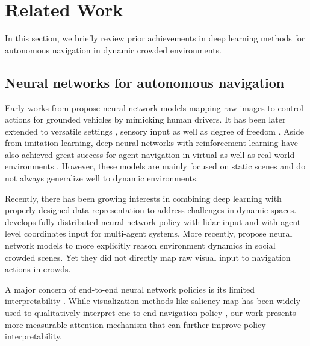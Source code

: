 \documentclass[10pt,twocolumn,letterpaper]{article}
\begin{document}

\section{Related Work}

In this section, we briefly review prior achievements in deep learning methods for autonomous navigation in dynamic crowded environments. 

\subsection{Neural networks for autonomous navigation}

Early works from \cite{dean_pomerleau_alvinn:_1989, muller_off-road_2006} propose neural network models mapping raw images to control actions for grounded vehicles by mimicking human drivers. It has been later extended to versatile settings \cite{chen_deepdriving:_2015, bojarski_end_2016, pan_agile_2017}, sensory input \cite{pfeiffer_perception_2017} as well as degree of freedom \cite{loquercio_dronet:_2018, levine_end--end_2015}. Aside from imitation learning, deep neural networks with reinforcement learning have also achieved great success for agent navigation in virtual \cite{mirowski_learning_2016, mirowski_learning_2018} as well as real-world environments \cite{tai_virtual--real_2017}. However, these models are mainly focused on static scenes and do not always generalize well to dynamic environments. 

Recently, there has been growing interests in combining deep learning with properly designed data representation to address challenges in dynamic spaces. \cite{long_deep-learned_2016} develops fully distributed neural network policy with lidar input and \cite{chen_decentralized_2017} with agent-level coordinates input for multi-agent systems. More recently, \cite{chen_socially_2017, chen_crowd-robot_2018} propose neural network models to more explicitly reason environment dynamics in social crowded scenes. Yet they did not directly map raw visual input to navigation actions in crowds.  

A major concern of end-to-end neural network policies is its limited interpretability \cite{sunderhauf_limits_2018}. While visualization methods like saliency map has been widely used to qualitatively interpret ene-to-end navigation policy \cite{chi_deep_2017,bojarski_explaining_2017}, our work presents more measurable attention mechanism that can further improve policy interpretability. 
\end{document}
